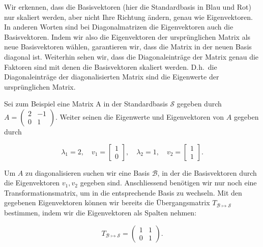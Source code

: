 \vspace{0.5\baselineskip}

Wir erkennen, dass die Basisvektoren (hier die Standardbasis in Blau und Rot) nur skaliert werden, aber nicht Ihre Richtung ändern, genau wie Eigenvektoren. In anderen Worten sind bei Diagonalmatrizen die Eigenvektoren auch die Basisvektoren. Indem wir also die Eigenvektoren der ursprünglichen Matrix als neue Basisvektoren wählen, garantieren wir, dass die Matrix in der neuen Basis diagonal ist. Weiterhin sehen wir, dass die Diagonaleinträge der Matrix genau die Faktoren sind mit denen die Basisvektoren skaliert werden. D.h.\ die Diagonaleinträge der diagonalisierten Matrix sind die Eigenwerte der ursprünglichen Matrix.

\vspace{1\baselineskip}

Sei zum Beispiel eine Matrix A in der Standardbasis \( \mathcal{S} \) gegeben durch \( A = \begin{pmatrix} 2 & -1 \\ 0 & 1 \end{pmatrix} \). Weiter seinen die Eigenwerte und Eigenvektoren von \( A \) gegeben durch

\begin{equation*}
    \lambda_1 = 2, \quad v_1 = \begin{bmatrix} 1 \\ 0 \end{bmatrix}, \quad \lambda_2 = 1, \quad v_2 = \begin{bmatrix} 1 \\ 1 \end{bmatrix}.
\end{equation*}

Um \( A \) zu diagonalisieren suchen wir eine Basis \( \mathcal{B} \), in der die Basisvektoren durch die Eigenvektoren \( v_1, v_2 \) gegeben sind. Anschliessend benötigen wir nur noch eine Transformationsmatrix, um in die entsprechende Basis zu wechseln. Mit den gegebenen Eigenvektoren können wir bereits die Übergangsmatrix \( T_{\mathcal{B} \mapsto \mathcal{S} } \) bestimmen, indem wir die Eigenvektoren als Spalten nehmen:

\begin{equation*}
    T_{\mathcal{B} \mapsto \mathcal{S} } = \begin{pmatrix} 1 & 1 \\ 0 & 1 \end{pmatrix}.
\end{equation*}

